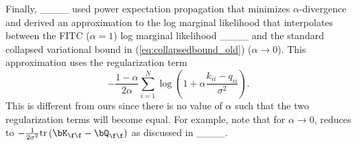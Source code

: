 Finally, 
____
used  power expectation 
propagation that minimizes  $\alpha$-divergence and derived an approximation 
to the log marginal likelihood that interpolates between the FITC ($\alpha=1$) log marginal 
likelihood ____ and the standard collapsed 
variational bound in (\ref{eq:collapsedbound_old})
($\alpha \rightarrow 0$).
This approximation uses the regularization 
term 
\begin{equation}
-\frac{1-\alpha}{2 \alpha}
\sum_{i=1}^N \log\left( 1 + 
\alpha \frac{k_{ii} - q_{ii}}{\sigma^2} \right). 
\label{eq:Buiregularization}
\end{equation}
This is different from 
ours since
there is no value of $\alpha$ 
such that the two regularization terms will become equal. 
For example, note that for $\alpha \rightarrow 0$,  
reduces to $-\frac{1}{2 \sigma^2} \text{tr}\left(  \bK_{\f\f} - \bQ_{\f\f} \right)$ as discussed 
in ____.